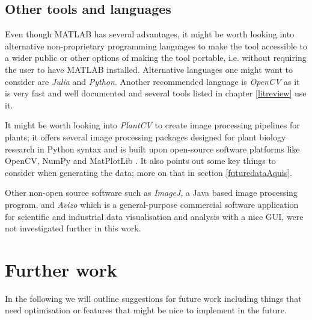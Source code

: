 

\subsection{Other tools and languages}

Even though MATLAB has several advantages, it might be worth looking into alternative non-proprietary programming languages to make the tool accessible to a wider public or other options of making the tool portable, i.e. without requiring the user to have MATLAB installed.
Alternative languages one might want to consider are \textit{Julia} and \textit{Python}. Another recommended language is \textit{OpenCV} as it is very fast and well documented and several tools listed in chapter \ref{litreview} use it. 

It might be worth looking into \textit{PlantCV} to create image processing pipelines for plants; it offers several image processing packages designed for plant biology research in Python syntax and is built upon open-source software platforms like OpenCV, NumPy and MatPlotLib \cite{plantCV}. It also points out some key things to consider when generating the data; more on that in section \ref{futuredataAquis}.

Other non-open source software such as \textit{ImageJ}, a Java based image processing program, and \textit{Avizo} which is a general-purpose commercial software application for scientific and industrial data visualisation and analysis with a nice GUI, were not investigated further in this work. 

 
\section{Further work}

In the following we will outline suggestions for future work including things that need optimisation or features that might be nice to implement in the future. 

